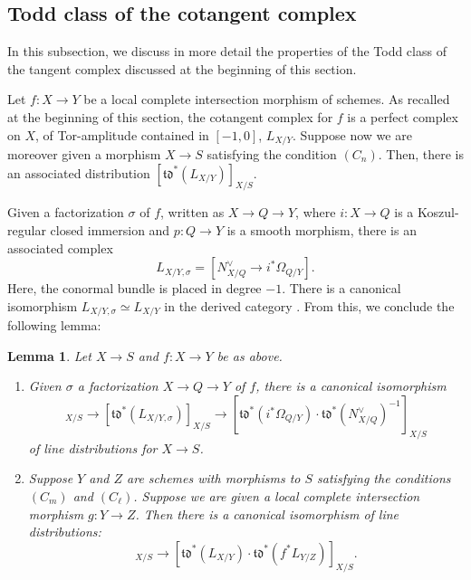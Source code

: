 \documentclass[11pt]{article}
\theoremstyle{plain}
\newtheorem{lemma}[theorem]{Lemma}
\theoremstyle{definition}
\newcommand{\tdfrak}{\mathfrak {td}}
\begin{document}
\subsection{Todd class of the cotangent complex }\label{subsubsec:td-class-tangent}
In this subsection, we discuss in more detail the properties of the Todd class of the tangent complex discussed at the beginning of this section.

Let $f: X\to Y$ be a local complete intersection morphism of schemes. As recalled at the beginning of this section, the cotangent complex for $f$ is a perfect complex on $X$, of Tor-amplitude contained in $[-1,0]$, $L_{X/Y}$. Suppose now we are moreover given a morphism $X \to S$ satisfying the condition $(C_n)$. Then, there is an associated distribution $[\tdfrak^*(L_{X/Y})]_{X/S}$.

Given a factorization $\sigma$ of $f$, written as $X\to Q\to Y$, where $i\colon X\to Q$ is a Koszul-regular closed immersion and $p\colon Q \to Y$ is a smooth morphism, there is an associated complex
\begin{equation}\label{eq:cotangent}
L_{X/Y, \sigma} = [N_{X/Q}^\vee \to i^* \Omega_{Q/Y}].
\end{equation}
Here, the conormal bundle is placed in degree $-1$. There is a canonical isomorphism $L_{X/Y, \sigma}\simeq L_{X/Y}$ in the derived category \cite[\href{https://stacks.math.columbia.edu/tag/0FV4}{0FV4}]{stacks-project}. From this, we conclude the following lemma:

\begin{lemma}\label{lemma:td-factorisation-independence}
Let $X \to S$ and $f\colon X\to Y$ be as above.
\begin{enumerate}
\item Given $\sigma$ a factorization $X\to Q\to Y$ of $f$, there is a canonical isomorphism
\begin{displaymath}
[\tdfrak^*(L_{X/Y})]_{X/S} \to [\tdfrak^*(L_{X/Y,\sigma})]_{X/S} \to [\tdfrak^*(i^\ast \Omega_{Q/Y}) \cdot \tdfrak^*(N^\vee_{X/Q})^{-1}]_{X/S}
\end{displaymath}
of line distributions for $X\to S$.
\item Suppose $Y$ and $Z$ are schemes with morphisms to $S$ satisfying the conditions $(C_m)$ and $(C_{\ell})$. Suppose we are given a local complete intersection morphism \hbox{$g \colon Y\to Z$}. Then there is a canonical isomorphism of line distributions:
\begin{displaymath}
[\tdfrak^*(L_{X/Z})]_{X/S} \to [\tdfrak^*(L_{X/Y}) \cdot \tdfrak^* (f^\ast L_{Y/Z})]_{X/S}.
\end{displaymath}
\end{enumerate}
\end{lemma}
\end{document}
